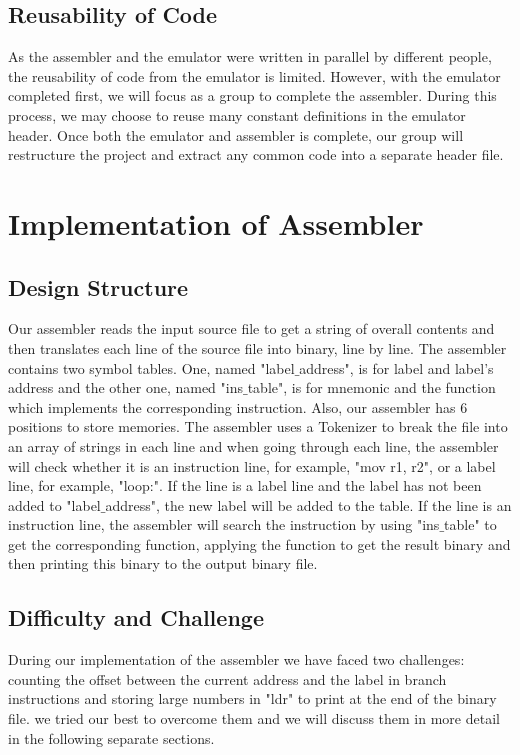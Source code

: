 \documentclass[11pt]{article}
\begin{document}
\subsection{Reusability of Code}
As the assembler and the emulator were written in parallel by different people, the reusability of code from the emulator is limited. However, with the emulator completed first, we will focus as a group to complete the assembler. During this process, we may choose to reuse many constant definitions in the emulator header. Once both the emulator and assembler is complete, our group will restructure the project and extract any common code into a separate header file.

\section{Implementation of Assembler}
\subsection{Design Structure}
Our assembler reads the input source file to get a string of overall contents and then translates each line of the source file into binary, line by line. The assembler contains two symbol tables. One, named "label$\_$address", is for label and label's address and the other one, named "ins$\_$table", is for mnemonic and the function which implements the corresponding instruction. Also, our assembler has 6 positions to store memories. The assembler uses a Tokenizer to break the file into an array of strings in each line and when going through each line, the assembler will check whether it is an instruction line, for example, "mov r1, r2", or a label line, for example, "loop:". If the line is a label line and the label has not been added to "label$\_$address", the new label will be added to the table. If the line is an instruction line, the assembler will search the instruction by using "ins$\_$table" to get the corresponding function, applying the function to get the result binary and then printing this binary to the output binary file. \newline
\noindent
\subsection{Difficulty and Challenge}
During our implementation of the assembler we have faced two challenges: counting the offset between the current address and the label in branch instructions and storing large numbers in "ldr" to print at the end of the binary file. we tried our best to overcome them and we will discuss them in more detail in the following separate sections.
\end{document}
